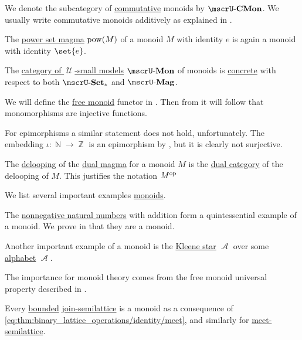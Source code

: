 \begin{definition}
\begin{thmenum}
    We denote the subcategory of \hyperref[def:magma/commutative]{commutative} monoids by \( \ucat{CMon} \). We usually write commutative monoids additively as explained in .

     The \hyperref[def:magma/power_set]{power set magma} \( \operatorname{pow}(M) \) of a monoid \( M \) with identity \( e \) is again a monoid with identity \( \set{ e } \).

     The \hyperref[def:category_of_small_first_order_models]{category of \( \mscrU \)-small models} \( \ucat{Mon} \) of monoids is \hyperref[def:concrete_category]{concrete} with respect to both \hyperref[def:pointed_set/category]{\( \ucat{Set}_* \)} and \hyperref[def:magma/category]{\( \ucat{Mag} \)}.

    We will define the \hyperref[def:free_monoid]{free monoid} functor in . Then from  it will follow that monomorphisms are injective functions.

    For epimorphisms a similar statement does not hold, unfortunately. The embedding \( \iota: \BbbN \to \BbbZ \) is an epimorphism by , but it is clearly not surjective.

     The \hyperref[def:monoid_delooping]{delooping} of the \hyperref[def:magma/duality]{dual magma} for a monoid \( M \) is the \hyperref[def:dual_category]{dual category} of the delooping of \( M \). This justifies the notation \( M^{\operatorname{op}} \)
  \end{thmenum}
\end{definition}

\begin{example}\label{ex:def:monoid}
  We list several important examples \hyperref[def:monoid]{monoids}.

  \begin{thmenum}
     The \hyperref[def:set_of_natural_numbers]{nonnegative natural numbers} with addition form a quintessential example of a monoid. We prove in  that they are a monoid.

     Another important example of a monoid is the \hyperref[def:formal_language/kleene_star]{Kleene star} \( \mscrA \) over some \hyperref[def:formal_language/alphabet]{alphabet} \( \mscrA \).

    The importance for monoid theory comes from the free monoid universal property described in .

     Every \hyperref[def:semilattice/bounded]{bounded} \hyperref[def:semilattice/join]{join-semilattice} is a monoid as a consequence of \eqref{eq:thm:binary_lattice_operations/identity/meet}, and similarly for \hyperref[def:semilattice/meet]{meet-semilattice}.
  \end{thmenum}
\end{example}

